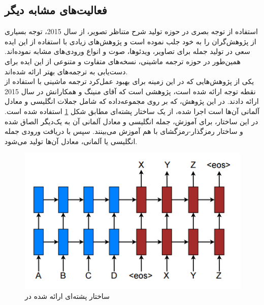 \subsection{فعالیت‌های مشابه دیگر}
استفاده از توجه بصری در حوزه تولید شرح متناظر تصویر، از سال 2015، توجه بسیاری از پژوهش‌گران را به خود جلب نموده است و پژوهش‌های زیادی با استفاده از این ایده سعی در تولید جمله برای تصاویر، ویدئو‌ها، صوت و انواع ورودی‌های مشابه نموده‌اند. همین‌طور در حوزه ترجمه ماشینی، نسخه‌های متفاوت و متنوعی از این ایده برای دست‌یابی به ترجمه‌های بهتر ارائه شده‌اند.
\\
یکی از پژوهش‌هایی که در این زمینه برای بهبود عمل‌کرد ترجمه ماشینی با استفاده از نقطه توجه ارائه شده است، پژوهشی است که آقای منینگ و همکارانش در سال 2015 ارائه دادند\cite{luong2015effective}.  در این پژوهش، که بر روی مجموعه‌داده  که شامل جملات انگلیسی و معادل آلمانی آن‌ها است اجرا شده، از یک ساختار پشته‌ای مطابق شکل \ref{fig:5-abnmt} استفاده شده است. در این ساختار، برای آموزش، جمله انگلیسی و معادل آلمانی آن به یک‌دیگر الصاق شده و ساختار رمزگذار-رمزگشای با هم آموزش می‌بینند. سپس با دریافت ورودی جمله انگلیسی یا آلمانی، معادل آن‌ها تولید می‌شود.



\begin{figure}[h]
	\centering
	\includegraphics[scale=0.6]{Imgs/abnmt.png}
	\caption{ساختار پشته‌ای ارائه شده در \cite{luong2015effective}}
	\label{fig:5-abnmt}
\end{figure}

